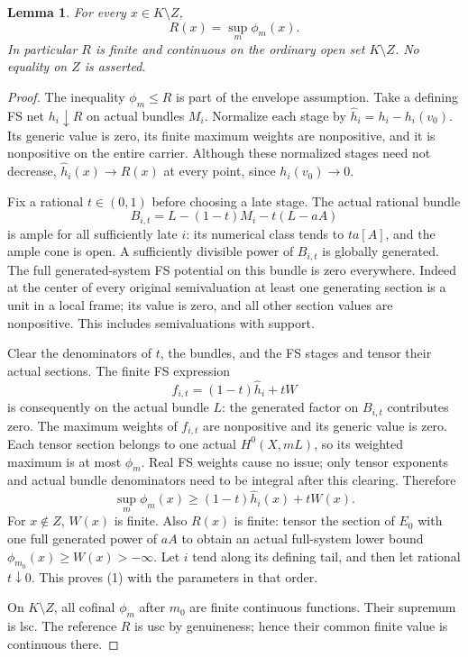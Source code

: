 \documentclass[11pt]{article}
\newtheorem{lemma}[theorem]{Lemma}
\begin{document}
\begin{lemma}\label{reference}
For every $x\in K\setminus Z$,
\[
                    R(x)=\sup_m\phi_m(x).             \tag{1}
\]
In particular $R$ is finite and continuous on the ordinary open set
$K\setminus Z$. No equality on $Z$ is asserted.
\end{lemma}
\begin{proof}
The inequality $\phi_m\leq R$ is part of the envelope assumption.
Take a defining FS net $h_i\downarrow R$ on actual bundles $M_i$.
Normalize each stage by $\widehat h_i=h_i-h_i(v_0)$. Its generic
value is zero, its finite maximum weights are nonpositive, and it is
nonpositive on the entire carrier. Although these normalized stages
need not decrease, $\widehat h_i(x)\to R(x)$ at every point, since
$h_i(v_0)\to0$.

Fix a rational $t\in(0,1)$ before choosing a late stage. The actual
rational bundle
\[
 B_{i,t}=L-(1-t)M_i-t(L-aA)
\]
is ample for all sufficiently late $i$: its numerical class tends to
$ta[A]$, and the ample cone is open. A sufficiently divisible power
of $B_{i,t}$ is globally generated. The full generated-system FS
potential on this bundle is zero everywhere. Indeed at the center of
every original semivaluation at least one generating section is a unit
in a local frame; its value is zero, and all other section values are
nonpositive. This includes semivaluations with support.

Clear the denominators of $t$, the bundles, and the FS stages and
tensor their actual sections. The finite FS expression
\[
                  f_{i,t}=(1-t)\widehat h_i+tW
\]
is consequently on the actual bundle $L$: the generated factor on
$B_{i,t}$ contributes zero. The maximum weights of $f_{i,t}$ are
nonpositive and its generic value is zero. Each tensor section belongs
to one actual $H^0(X,mL)$, so its weighted maximum is at most $\phi_m$.
Real FS weights cause no issue; only tensor exponents and actual bundle
denominators need to be integral after this clearing. Therefore
\[
             \sup_m\phi_m(x)\geq(1-t)\widehat h_i(x)+tW(x).
\]
For $x\notin Z$, $W(x)$ is finite. Also $R(x)$ is finite: tensor the
section of $E_0$ with one full generated power of $aA$ to obtain an
actual full-system lower bound $\phi_{m_0}(x)\geq W(x)>-\infty$.
Let $i$ tend along its defining tail, and then let rational $t\downarrow0$.
This proves (1) with the parameters in that order.

On $K\setminus Z$, all cofinal $\phi_m$ after $m_0$ are finite
continuous functions. Their supremum is lsc. The reference $R$ is usc
by genuineness; hence their common finite value is continuous there.
\end{proof}
\end{document}
